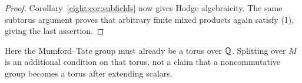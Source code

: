 \begin{proof}
Corollary~\ref{eight:cor:subfields} now gives Hodge algebraicity.
The same subtorus argument proves that arbitrary finite mixed products
again satisfy (1), giving the last assertion.
\end{proof}
Here the Mumford--Tate group must already be a torus over $\mathbb Q$.
Splitting over $M$ is an additional condition on that torus, not a claim
that a noncommutative group becomes a torus after extending scalars.

